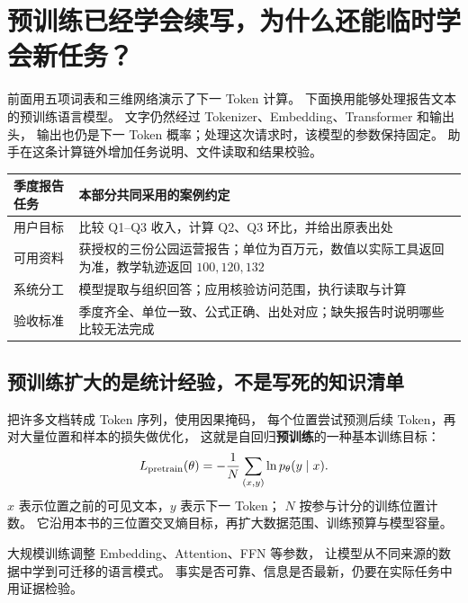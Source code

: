 \chapterrule
\section{预训练已经学会续写，为什么还能临时学会新任务？}
\label{intro:23aa-pretraining-icl}

\label{concept:pretraining}
\label{concept:in-context-learning}


前面用五项词表和三维网络演示了下一 Token 计算。
下面换用能够处理报告文本的预训练语言模型。
文字仍然经过 Tokenizer、Embedding、Transformer 和输出头，
输出也仍是下一 Token 概率；处理这次请求时，该模型的参数保持固定。
助手在这条计算链外增加任务说明、文件读取和结果校验。



\begin{center}\small
{}
\begin{tabularx}{\linewidth}{@{}p{22mm}X@{}}\toprule
季度报告任务 & 本部分共同采用的案例约定\\\midrule
用户目标 & 比较 Q1--Q3 收入，计算 Q2、Q3 环比，并给出原表出处\\
可用资料 & 获授权的三份公园运营报告；单位为百万元，数值以实际工具返回为准，教学轨迹返回 $100,120,132$\\
系统分工 & 模型提取与组织回答；应用核验访问范围，执行读取与计算\\
验收标准 & 季度齐全、单位一致、公式正确、出处对应；缺失报告时说明哪些比较无法完成\\\bottomrule
\end{tabularx}
\end{center}

\subsection{预训练扩大的是统计经验，不是写死的知识清单}

把许多文档转成 Token 序列，使用因果掩码，
每个位置尝试预测后续 Token，再对大量位置和样本的损失做优化，
这就是自回归\textbf{预训练}的一种基本训练目标：
\[
L_{\rm pretrain}(\theta)=
-\frac1N\sum_{(x,y)}\ln p_\theta(y\mid x).
\]
$x$ 表示位置之前的可见文本，$y$ 表示下一 Token；
$N$ 按参与计分的训练位置计数。
它沿用本书的三位置交叉熵目标，再扩大数据范围、训练预算与模型容量。

大规模训练调整 Embedding、Attention、FFN 等参数，
让模型从不同来源的数据中学到可迁移的语言模式。
事实是否可靠、信息是否最新，仍要在实际任务中用证据检验。

